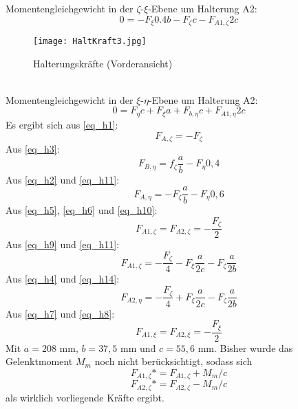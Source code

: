 Momentengleichgewicht in der $\zeta$-$\xi$-Ebene um Halterung A2:
\begin{equation}\label{eq_h8}
	0= -F_\xi 0.4b - F_{\zeta}c-F_{A1,\zeta}2c
\end{equation}
\begin{figure}[h] 
\centering
\texttt{[image: HaltKraft3.jpg]}
\caption{Halterungskräfte (Vorderansicht)}
\label{abb_AnhangHK3}
\end{figure}\\
Momentengleichgewicht in der $\xi$-$\eta$-Ebene um Halterung A2:
\begin{equation}\label{eq_h9}
	0= F_\eta c + F_{\xi}a+F_{b,\eta}c+F_{A1,\eta}2c
\end{equation}
Es ergibt sich aus \ref{eq_h1}:
\begin{equation}\label{eq_h10}
	F_{A, \zeta} = -F_\zeta
\end{equation}
Aus \ref{eq_h3}:
\begin{equation}\label{eq_h11}
	F_{B,\eta} = f_\zeta \frac{a}{b} - F_\eta 0,4
\end{equation}
Aus \ref{eq_h2} und \ref{eq_h11}:
\begin{equation}\label{eq_h12}
	F_{A, \eta} = -F_\zeta \frac{a}{b} - F_\eta 0,6
\end{equation}
Aus \ref{eq_h5}, \ref{eq_h6} und \ref{eq_h10}:
\begin{equation}\label{eq_h13}
	F_{A1, \zeta} = F_{A2, \zeta} = -\frac{F_\zeta}{2}
\end{equation}
Aus \ref{eq_h9} und \ref{eq_h11}:
\begin{equation}\label{eq_h14}
	F_{A1, \zeta} = -\frac{F_\zeta}{4}-F_\xi \frac{a}{2c}-F_\zeta \frac{a}{2b}
\end{equation}
Aus \ref{eq_h4} und \ref{eq_h14}:
\begin{equation}\label{eq_h15}
	F_{A2, \eta} = -\frac{F_\zeta}{4}+F_\xi \frac{a}{2c}-F_\zeta \frac{a}{2b}
\end{equation}
Aus \ref{eq_h7} und \ref{eq_h8}:
\begin{equation}\label{eq_h16}
F_{A1, \xi} = F_{A2, \xi} = -\frac{F_{\xi}}{2}
\end{equation}
Mit $a = 208$ mm, $b=37,5$ mm und $c = 55,6$ mm.
Bisher wurde das Gelenktmoment $M_m$ noch nicht berücksichtigt, sodass sich
\begin{equation}
	F_{A1,\zeta}* = F_{A1,\zeta} +M_m/c
\end{equation}
\begin{equation}
F_{A2,\zeta}* = F_{A2,\zeta} -M_m/c
\end{equation}
 als wirklich vorliegende Kräfte ergibt.